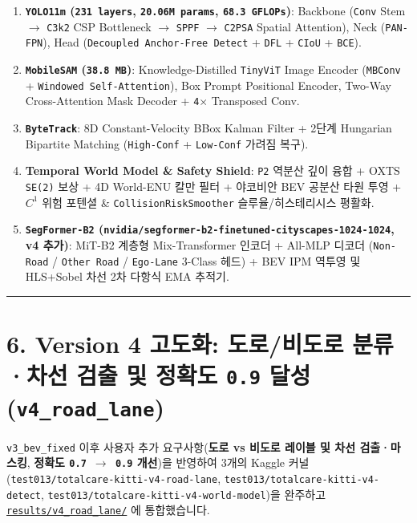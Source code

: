 \documentclass[10.5pt,a4paper]{article}
\begin{document}
\begin{enumerate}[leftmargin=1.8em,itemsep=2pt]
\item \textbf{\texttt{YOLO11m} (\texttt{231 layers}, \texttt{20.\allowbreak{}06M params}, \texttt{68.\allowbreak{}3 GFLOPs})}: Backbone (\texttt{Conv} Stem $\rightarrow$ \texttt{C3k2} CSP Bottleneck $\rightarrow$ \texttt{SPPF} $\rightarrow$ \texttt{C2PSA} Spatial Attention), Neck (\texttt{PAN-\allowbreak{}FPN}), Head (\texttt{Decoupled Anchor-\allowbreak{}Free Detect} + \texttt{DFL} + \texttt{CIoU} + \texttt{BCE}).
\item \textbf{\texttt{MobileSAM} (\texttt{38.\allowbreak{}8 MB})}: Knowledge-Distilled \texttt{TinyViT} Image Encoder (\texttt{MBConv} + \texttt{Windowed Self-\allowbreak{}Attention}), Box Prompt Positional Encoder, Two-Way Cross-Attention Mask Decoder + \texttt{4$\times$} Transposed Conv.
\item \textbf{\texttt{ByteTrack}}: 8D Constant-Velocity BBox Kalman Filter + 2단계 Hungarian Bipartite Matching (\texttt{High-\allowbreak{}Conf} + \texttt{Low-\allowbreak{}Conf} 가려짐 복구).
\item \textbf{Temporal World Model \& Safety Shield}: \texttt{P2} 역분산 깊이 융합 + OXTS \texttt{SE(2)} 보상 + 4D World-ENU 칼만 필터 + 야코비안 BEV 공분산 타원 투영 + $C^1$ 위험 포텐셜 \& \texttt{CollisionRiskSmoother} 슬루율/히스테리시스 평활화.
\item \textbf{\texttt{SegFormer-\allowbreak{}B2} (\texttt{nvidia/\allowbreak{}segformer-\allowbreak{}b2-\allowbreak{}finetuned-\allowbreak{}cityscapes-\allowbreak{}1024-\allowbreak{}1024}, v4 추가)}: MiT-B2 계층형 Mix-Transformer 인코더 + All-MLP 디코더 (\texttt{Non-\allowbreak{}Road} / \texttt{Other Road} / \texttt{Ego-\allowbreak{}Lane} 3-Class 헤드) + BEV IPM 역투영 및 HLS+Sobel 차선 2차 다항식 EMA 추적기.
\end{enumerate}

\par\noindent\rule{\textwidth}{0.4pt}\par\medskip

\section{6. Version 4 고도화: 도로/비도로 분류·차선 검출 및 정확도 \texttt{0.\allowbreak{}9} 달성 (\texttt{v4\_\allowbreak{}road\_\allowbreak{}lane})}

\texttt{v3\_\allowbreak{}bev\_\allowbreak{}fixed} 이후 사용자 추가 요구사항(\textbf{도로 vs 비도로 레이블 및 차선 검출·마스킹}, \textbf{정확도 \texttt{0.\allowbreak{}7 $\rightarrow$ 0.\allowbreak{}9} 개선})을 반영하여 3개의 Kaggle 커널(\texttt{test013/\allowbreak{}totalcare-\allowbreak{}kitti-\allowbreak{}v4-\allowbreak{}road-\allowbreak{}lane}, \texttt{test013/\allowbreak{}totalcare-\allowbreak{}kitti-\allowbreak{}v4-\allowbreak{}detect}, \texttt{test013/\allowbreak{}totalcare-\allowbreak{}kitti-\allowbreak{}v4-\allowbreak{}world-\allowbreak{}model})을 완주하고 \href{https://github.com/Heisnotanimposter/Totalcare\_autonomous\_driving\_Yolov5/tree/main/results/v4\_road\_lane/}{\texttt{results/\allowbreak{}v4\_\allowbreak{}road\_\allowbreak{}lane/\allowbreak{}}} 에 통합했습니다.
\end{document}
